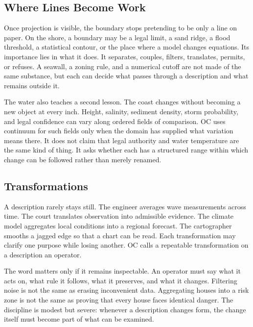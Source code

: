\documentclass[11pt,a4paper,openany]{book}
\begin{document}
\subsection{Where Lines Become Work}
Once projection is visible, the boundary stops pretending to be only a line on paper. On the shore, a boundary may be a legal limit, a sand ridge, a flood threshold, a statistical contour, or the place where a model changes equations. Its importance lies in what it does. It separates, couples, filters, translates, permits, or refuses. A seawall, a zoning rule, and a numerical cutoff are not made of the same substance, but each can decide what passes through a description and what remains outside it. \cite{grimmett_percolation,goldenfeld_lectures}\par
The water also teaches a second lesson. The coast changes without becoming a new object at every inch. Height, salinity, sediment density, storm probability, and legal confidence can vary along ordered fields of comparison. OC uses continuum for such fields only when the domain has supplied what variation means there. It does not claim that legal authority and water temperature are the same kind of thing. It asks whether each has a structured range within which change can be followed rather than merely renamed.\par
\subsection{Transformations}
A description rarely stays still. The engineer averages wave measurements across time. The court translates observation into admissible evidence. The climate model aggregates local conditions into a regional forecast. The cartographer smooths a jagged edge so that a chart can be read. Each transformation may clarify one purpose while losing another. OC calls a repeatable transformation on a description an operator. \cite{grimmett_percolation,goldenfeld_lectures}\par
The word matters only if it remains inspectable. An operator must say what it acts on, what rule it follows, what it preserves, and what it changes. Filtering noise is not the same as erasing inconvenient data. Aggregating houses into a risk zone is not the same as proving that every house faces identical danger. The discipline is modest but severe: whenever a description changes form, the change itself must become part of what can be examined.\par
\end{document}

